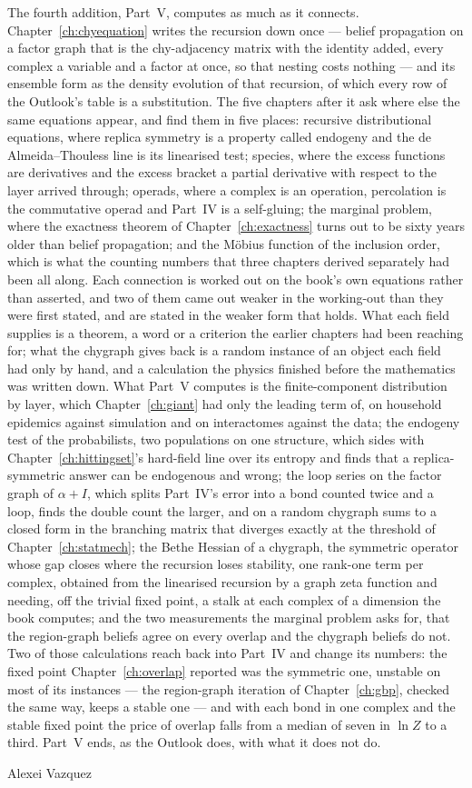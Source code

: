 The fourth addition, Part~V, computes as much as it connects. Chapter~\ref{ch:chyequation}
writes the recursion down once --- belief propagation on a factor graph
that is the chy-adjacency matrix with the identity added, every complex a
variable and a factor at once, so that nesting costs nothing --- and its
ensemble form as the density evolution of that recursion, of which every
row of the Outlook's table is a substitution. The five chapters after it
ask where else the same equations appear, and find them in five places:
recursive distributional equations, where replica symmetry is a property
called endogeny and the de Almeida--Thouless line is its linearised test;
species, where the excess functions are derivatives and the excess bracket
a partial derivative with respect to the layer arrived through; operads,
where a complex is an operation, percolation is the commutative operad and
Part~IV is a self-gluing; the marginal problem, where the exactness
theorem of Chapter~\ref{ch:exactness} turns out to be sixty years older
than belief propagation; and the M\"obius function of the inclusion order,
which is what the counting numbers that three chapters derived separately
had been all along. Each connection is worked out on the book's own
equations rather than asserted, and two of them came out weaker in the
working-out than they were first stated, and are stated in the weaker
form that holds. What
each field supplies is a theorem, a word or a criterion the earlier chapters
had been reaching for; what the chygraph gives back is a random instance
of an object each field had only by hand, and a calculation the physics
finished before the mathematics was written down. What Part~V computes is
the finite-component distribution by layer, which Chapter~\ref{ch:giant}
had only the leading term of, on household epidemics against simulation
and on interactomes against the data; the endogeny test of the
probabilists, two populations on one structure, which sides with
Chapter~\ref{ch:hittingset}'s hard-field line over its entropy and finds
that a replica-symmetric answer can be endogenous and wrong; the loop
series on the factor graph of $\alpha+I$, which splits Part~IV's error
into a bond counted twice and a loop, finds the double count the larger,
and on a random chygraph sums to a closed form in the branching matrix
that diverges exactly at the threshold of Chapter~\ref{ch:statmech}; the
Bethe Hessian of a chygraph, the symmetric operator whose gap closes where
the recursion loses stability, one rank-one term per complex, obtained
from the linearised recursion by a graph zeta function and needing, off
the trivial fixed point, a stalk at each complex of a dimension the book
computes; and the two measurements the marginal problem asks for, that
the region-graph beliefs agree on every overlap and the chygraph beliefs
do not. Two of those calculations reach back into Part~IV and change its
numbers: the fixed point Chapter~\ref{ch:overlap} reported was the
symmetric one, unstable on most of its instances --- the region-graph
iteration of Chapter~\ref{ch:gbp}, checked the same way, keeps a stable
one --- and with each bond in one complex and the stable fixed point the
price of overlap falls from a median of seven in $\ln Z$ to a third. Part~V ends, as the Outlook does,
with what it does not do.

\vspace{1em}
\noindent Alexei Vazquez
